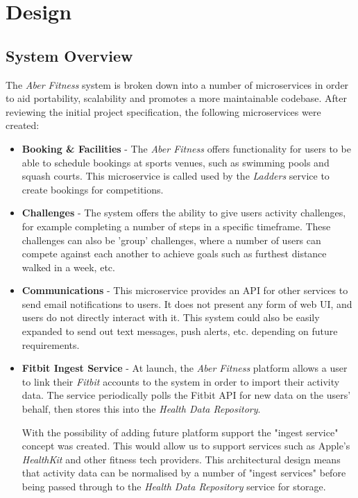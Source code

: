 \chapter{Design}

\section{System Overview}
The \textit{Aber Fitness} system is broken down into a number of microservices in order to aid portability, scalability and promotes a more maintainable codebase. After reviewing the initial project specification, the following microservices were created:

\begin{itemize}

	\item \textbf{Booking \& Facilities} - The \textit{Aber Fitness} offers functionality for users to be able to schedule bookings at sports venues, such as swimming pools and squash courts. This microservice is called used by the \textit{Ladders} service to create bookings for competitions.

	\item \textbf{Challenges} - The system offers the ability to give users activity challenges, for example completing a number of steps in a specific timeframe. These challenges can also be 'group' challenges, where a number of users can compete against each another to achieve goals such as furthest distance walked in a week, etc.

	\item \textbf{Communications} - This microservice provides an API for other services to send email notifications to users. It does not present any form of web UI, and users do not directly interact with it. This system could also be easily expanded to send out text messages, push alerts, etc. depending on future requirements.

	\item \textbf{Fitbit Ingest Service} - At launch, the \textit{Aber Fitness} platform allows a user to link their \textit{Fitbit} accounts to the system in order to import their activity data. The service periodically polls the Fitbit API for new data on the users' behalf, then stores this into the \textit{Health Data Repository}.
	
	\par With the possibility of adding future platform support the "ingest service" concept was created. This would allow us to support services such as Apple's \textit{HealthKit} and other fitness tech providers. 
	This architectural design means that activity data can be normalised by a number of "ingest services" before being passed through to the \textit{Health Data Repository} service for storage. 


\end{itemize}
